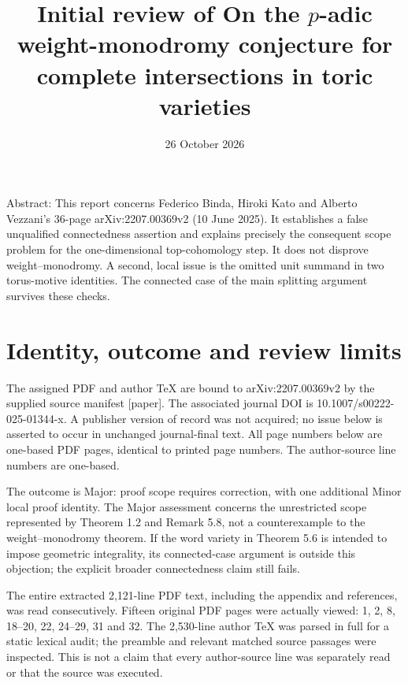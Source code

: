 \documentclass[10pt]{article}
\title{Initial review of
On the \(p\)-adic weight-monodromy conjecture
for complete intersections in toric varieties}
\author{}
\date{26 October 2026}
\begin{document}
\maketitle
Abstract: This report concerns Federico Binda, Hiroki Kato and Alberto Vezzani’s 36-page arXiv:2207.00369v2 (10 June 2025). It establishes a false unqualified connectedness assertion and explains precisely the consequent scope problem for the one-dimensional top-cohomology step. It does not disprove weight–monodromy. A second, local issue is the omitted unit summand in two torus-motive identities. The connected case of the main splitting argument survives these checks.\par
\section*{Identity, outcome and review limits}
The assigned PDF and author TeX are bound to arXiv:2207.00369v2 by the supplied source manifest [paper]. The associated journal DOI is 10.1007/s00222-025-01344-x. A publisher version of record was not acquired; no issue below is asserted to occur in unchanged journal-final text. All page numbers below are one-based PDF pages, identical to printed page numbers. The author-source line numbers are one-based.\par
The outcome is Major: proof scope requires correction, with one additional Minor local proof identity. The Major assessment concerns the unrestricted scope represented by Theorem 1.2 and Remark 5.8, not a counterexample to the weight–monodromy theorem. If the word variety in Theorem 5.6 is intended to impose geometric integrality, its connected-case argument is outside this objection; the explicit broader connectedness claim still fails.\par
The entire extracted 2,121-line PDF text, including the appendix and references, was read consecutively. Fifteen original PDF pages were actually viewed: 1, 2, 8, 18–20, 22, 24–29, 31 and 32. The 2,530-line author TeX was parsed in full for a static lexical audit; the preamble and relevant matched source passages were inspected. This is not a claim that every author-source line was separately read or that the source was executed.\par
\end{document}
